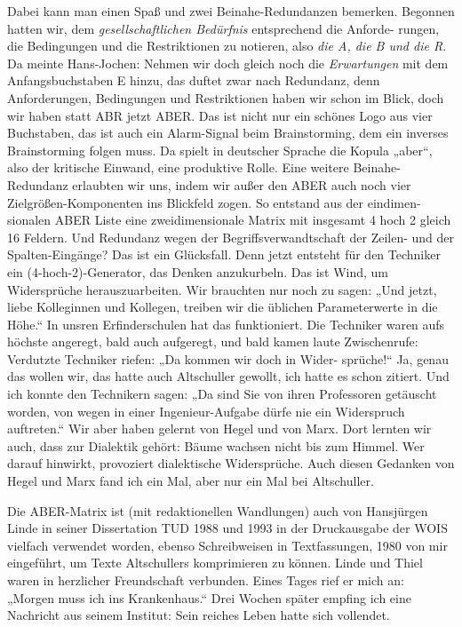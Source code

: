 \documentclass[12pt,a4paper]{article}
\begin{document}
Dabei kann man einen Spaß und zwei Beinahe-Redundanzen bemerken. Begonnen
hatten wir, dem \emph{gesellschaftlichen Bedürfnis} entsprechend die Anforde-
rungen, die Bedingungen und die Restriktionen zu notieren, also \emph{die A,
  die B und die R}. Da meinte Hans-Jochen: Nehmen wir doch gleich noch die
\emph{Erwartungen} mit dem Anfangsbuchstaben E hinzu, das duftet zwar nach
Redundanz, denn Anforderungen, Bedingungen und Restriktionen haben wir schon
im Blick, doch wir haben statt ABR jetzt ABER. Das ist nicht nur ein schönes
Logo aus vier Buchstaben, das ist auch ein Alarm-Signal beim Brainstorming,
dem ein inverses Brainstorming folgen muss. Da spielt in deutscher Sprache die
Kopula „aber“, also der kritische Einwand, eine produktive Rolle. Eine weitere
Beinahe-Redundanz erlaubten wir uns, indem wir außer den ABER auch noch vier
Zielgrößen-Komponenten ins Blickfeld zogen. So entstand aus der eindimen-
sionalen ABER Liste eine zweidimensionale Matrix mit insgesamt 4 hoch 2 gleich
16 Feldern. Und Redundanz wegen der Begriffsverwandtschaft der Zeilen- und der
Spalten-Eingänge? Das ist ein Glücksfall. Denn jetzt entsteht für den
Techniker ein (4-hoch-2)-Generator, das Denken anzukurbeln. Das ist Wind, um
Widersprüche herauszuarbeiten. Wir brauchten nur noch zu sagen: „Und jetzt,
liebe Kolleginnen und Kollegen, treiben wir die üblichen Parameterwerte in
die Höhe.“ In unsren Erfinderschulen hat das funktioniert. Die Techniker
waren aufs höchste angeregt, bald auch aufgeregt, und bald kamen laute
Zwischenrufe: Verdutzte Techniker riefen: „Da kommen wir doch in Wider-
sprüche!“ Ja, genau das wollen wir, das hatte auch Altschuller gewollt, ich
hatte es schon zitiert. Und ich konnte den Technikern sagen: „Da sind Sie von
ihren Professoren getäuscht worden, von wegen in einer Ingenieur-Aufgabe dürfe
nie ein Widerspruch auftreten.“ Wir aber haben gelernt von Hegel und von Marx.
Dort lernten wir auch, dass zur Dialektik gehört: Bäume wachsen nicht bis zum
Himmel. Wer darauf hinwirkt, provoziert dialektische Widersprüche. Auch diesen
Gedanken von Hegel und Marx fand ich ein Mal, aber nur ein Mal bei
Altschuller.

Die ABER-Matrix ist (mit redaktionellen Wandlungen) auch von Hansjürgen Linde
in seiner Dissertation TUD 1988 und 1993 in der Druckausgabe der WOIS vielfach
verwendet worden, ebenso Schreibweisen in Textfassungen, 1980 von mir
eingeführt, um Texte Altschullers komprimieren zu können. Linde und Thiel
waren in herzlicher Freundschaft verbunden. Eines Tages rief er mich an:
„Morgen muss ich ins Krankenhaus.“ Drei Wochen später empfing ich eine
Nachricht aus seinem Institut: Sein reiches Leben hatte sich vollendet.
\end{document}
